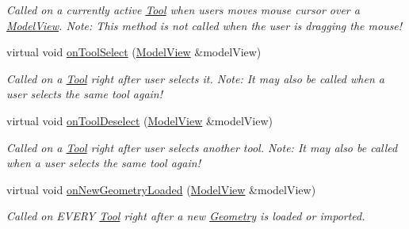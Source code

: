\begin{DoxyCompactItemize}
\begin{DoxyCompactList}\small\item\em Called on a currently active \mbox{\hyperlink{classpepr3d_1_1_tool}{Tool}} when users moves mouse cursor over a \mbox{\hyperlink{classpepr3d_1_1_model_view}{Model\+View}}. Note\+: This method is not called when the user is dragging the mouse! \end{DoxyCompactList}\item 
\mbox{\label{classpepr3d_1_1_tool_a139c1e72bd9eada36ce660e1fbf10c6b}} 
virtual void \mbox{\hyperlink{classpepr3d_1_1_tool_a139c1e72bd9eada36ce660e1fbf10c6b}{on\+Tool\+Select}} (\mbox{\hyperlink{classpepr3d_1_1_model_view}{Model\+View}} \&model\+View)
\begin{DoxyCompactList}\small\item\em Called on a \mbox{\hyperlink{classpepr3d_1_1_tool}{Tool}} right after user selects it. Note\+: It may also be called when a user selects the same tool again! \end{DoxyCompactList}\item 
\mbox{\label{classpepr3d_1_1_tool_aafba698d859abbc2b1dc48a38ca24d36}} 
virtual void \mbox{\hyperlink{classpepr3d_1_1_tool_aafba698d859abbc2b1dc48a38ca24d36}{on\+Tool\+Deselect}} (\mbox{\hyperlink{classpepr3d_1_1_model_view}{Model\+View}} \&model\+View)
\begin{DoxyCompactList}\small\item\em Called on a \mbox{\hyperlink{classpepr3d_1_1_tool}{Tool}} right after user selects another tool. Note\+: It may also be called when a user selects the same tool again! \end{DoxyCompactList}\item 
\mbox{\label{classpepr3d_1_1_tool_ac94e48ba121b7f4e4bf897de871ad479}} 
virtual void \mbox{\hyperlink{classpepr3d_1_1_tool_ac94e48ba121b7f4e4bf897de871ad479}{on\+New\+Geometry\+Loaded}} (\mbox{\hyperlink{classpepr3d_1_1_model_view}{Model\+View}} \&model\+View)
\begin{DoxyCompactList}\small\item\em Called on E\+V\+E\+RY \mbox{\hyperlink{classpepr3d_1_1_tool}{Tool}} right after a new \mbox{\hyperlink{classpepr3d_1_1_geometry}{Geometry}} is loaded or imported. \end{DoxyCompactList}\item 

\end{DoxyCompactItemize}
